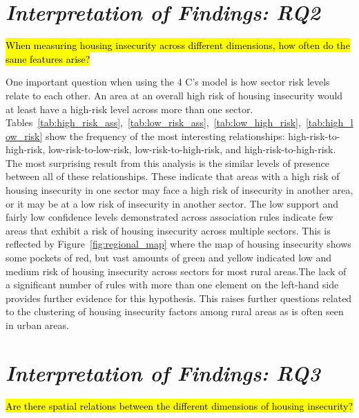 \section{\textit{Interpretation of Findings: RQ2}}

\hl{When measuring housing insecurity across different dimensions, how often do the same features arise?}

One important question when using the 4 C's model is how sector risk levels relate to each other. An area at an overall high risk of housing insecurity would at least have a high-risk level across more than one sector. Tables~\ref{tab:high_risk_ass},~\ref{tab:low_risk_ass},~\ref{tab:low_high_risk},~\ref{tab:high_low_risk} show the frequency of the most interesting relationships: high-risk-to-high-risk, low-risk-to-low-risk, low-risk-to-high-risk, and high-risk-to-high-risk. The most surprising result from this analysis is the similar levels of presence between all of these relationships. These indicate that areas with a high risk of housing insecurity in one sector may face a high risk of insecurity in another area, or it may be at a low risk of insecurity in another sector. The low support and fairly low confidence levels demonstrated across association rules indicate few areas that exhibit a risk of housing insecurity across multiple sectors. This is reflected by Figure~\ref{fig:regional_map} where the map of housing insecurity shows some pockets of red, but vast amounts of green and yellow indicated low and medium risk of housing insecurity across sectors for most rural areas.The lack of a significant number of rules with more than one element on the left-hand side provides further evidence for this hypothesis. This raises further questions related to the clustering of housing insecurity factors among rural areas as is often seen in urban areas. 

\section{\textit{Interpretation of Findings: RQ3}}

\hl{Are there spatial relations between the different dimensions of housing insecurity? }

